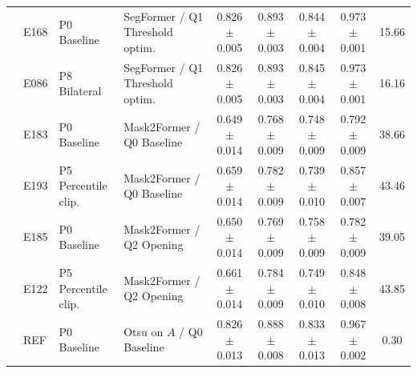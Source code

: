 \begin{table}[t]
\begin{tabularx}{\textwidth}{L{2.05cm} L{0.6cm} L{2.3cm} Y c c c c c}
 & E168 & P0 Baseline & SegFormer / Q1 Threshold optim. & 0.826{\scriptsize$\pm$0.005} & 0.893{\scriptsize$\pm$0.003} & 0.844{\scriptsize$\pm$0.004} & 0.973{\scriptsize$\pm$0.001} & 15.66 \\
 & E086 & P8 Bilateral & SegFormer / Q1 Threshold optim. & 0.826{\scriptsize$\pm$0.005} & 0.893{\scriptsize$\pm$0.003} & 0.845{\scriptsize$\pm$0.004} & 0.973{\scriptsize$\pm$0.001} & 16.16 \\
\addlinespace
 & E183 & P0 Baseline & Mask2Former / Q0 Baseline & 0.649{\scriptsize$\pm$0.014} & 0.768{\scriptsize$\pm$0.009} & 0.748{\scriptsize$\pm$0.009} & 0.792{\scriptsize$\pm$0.009} & 38.66 \\
 & E193 & P5 Percentile clip. & Mask2Former / Q0 Baseline & 0.659{\scriptsize$\pm$0.014} & 0.782{\scriptsize$\pm$0.009} & 0.739{\scriptsize$\pm$0.010} & 0.857{\scriptsize$\pm$0.007} & 43.46 \\
 & E185 & P0 Baseline & Mask2Former / Q2 Opening & 0.650{\scriptsize$\pm$0.014} & 0.769{\scriptsize$\pm$0.009} & 0.758{\scriptsize$\pm$0.009} & 0.782{\scriptsize$\pm$0.009} & 39.05 \\
 & E122 & P5 Percentile clip. & Mask2Former / Q2 Opening & 0.661{\scriptsize$\pm$0.014} & 0.784{\scriptsize$\pm$0.009} & 0.749{\scriptsize$\pm$0.010} & 0.848{\scriptsize$\pm$0.008} & 43.85 \\
\addlinespace
 & REF & P0 Baseline & Otsu on $A$ / Q0 Baseline & 0.826{\scriptsize$\pm$0.013} & 0.888{\scriptsize$\pm$0.008} & 0.833{\scriptsize$\pm$0.013} & 0.967{\scriptsize$\pm$0.002} & 0.30 \\
\bottomrule
\end{tabularx}
\end{table}
